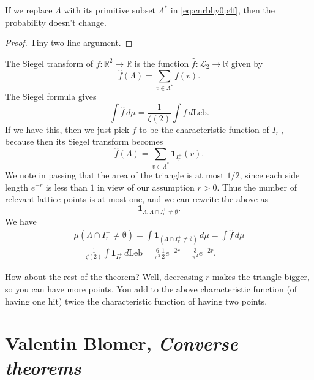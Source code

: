 \documentclass[reqno]{amsart} 
\numberwithin{theorem}{section}
\numberwithin{equation}{section}
\begin{document}
\begin{lemma}\label{lemma:cnrbhy04e7}
  If we replace $\Lambda$ with its primitive subset $\Lambda^\ast$ in \eqref{eq:cnrbhy0p4f}, then the probability doesn't change.
\end{lemma}
\begin{proof}
  Tiny two-line argument.
\end{proof}

The Siegel transform of $f : \mathbb{R}^2 \rightarrow \mathbb{R}$ is the function $\hat{f} : \mathcal{L}_2 \rightarrow \mathbb{R}$ given by
\begin{equation*}
  \hat{f}(\Lambda) = \sum_{v \in \Lambda^\ast} f(v).
\end{equation*}
The Siegel formula gives
\begin{equation*}
  \int \hat{f} \, d \mu = \frac{1}{\zeta(2)} \int f \, d \mathrm{Leb}.
\end{equation*}
If we have this, then we just pick $f$ to be the characteristic function of $I_r^+$, because then its Siegel transform becomes
\begin{equation*}
  \hat{f}(\Lambda) = \sum_{v \in \Lambda^\ast} \mathbf{1}_{I_r^+}(v).
\end{equation*}
We note in passing that the area of the triangle is at most $1/2$, since each side length $e^{- r}$ is less than $1$ in view of our assumption $r > 0$.  Thus the number of relevant lattice points is at most one, and we can rewrite the above as
\begin{equation*}
  \mathbf{1}_{\Lambda : \Lambda \cap I_r^+ \neq \emptyset}.
\end{equation*}
We have
\begin{multline*}
  \mu \left( \Lambda \cap I_r^+ \neq \emptyset \right) = \int \mathbf{1}_{(\Lambda \cap I_r^+ \neq \emptyset) } \, d \mu
  = \int \hat{f} \, d \mu
  \\
  = \frac{1}{\zeta(2)}
  \int \mathbf{1}_{I_r^+} \, d \mathrm{Leb}
  =
  \frac{6}{\pi^2} \frac{1}{2} e^{- 2 r} = \frac{3}{\pi^2} e^{- 2 r}.
\end{multline*}

How about the rest of the theorem?  Well, decreasing $r$ makes the triangle bigger, so you can have more points.  You add to the above characteristic function (of having one hit) twice the characteristic function of having two points.

\section{Valentin Blomer, \emph{Converse theorems}}
\end{document}
